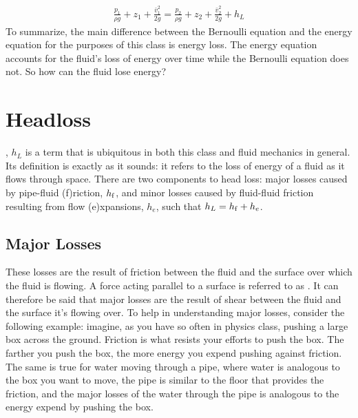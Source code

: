\documentclass[letterpaper,10pt,english]{sphinxmanual}
\begin{document}
\begin{equation}\label{equation:Fluids_Review/Fluids_Review_Design:Fluids_Review/Fluids_Review_Design:8}
\begin{split}\frac{p_{1}}{\rho g} + z_{1} + \frac{\bar v_{1}^2}{2g} = \frac{p_{2}}{\rho g} + z_{2} + \frac{\bar v_{2}^2}{2g} + h_L\end{split}
\end{equation}
 To summarize, the main difference between the Bernoulli equation and the energy equation for the purposes of this class is energy loss. The energy equation accounts for the fluid’s loss of energy over time while the Bernoulli equation does not. So how can the fluid lose energy?


\section{Headloss}
\label{\detokenize{Fluids_Review/Fluids_Review_Design:headloss}}\label{\detokenize{Fluids_Review/Fluids_Review_Design:id6}}
, \(h_L\) is a term that is ubiquitous in both this class and fluid mechanics in general. Its definition is exactly as it sounds: it refers to the loss of energy of a fluid as it flows through space. There are two components to head loss: major losses caused by pipe-fluid (f)riction, \(h_{\rm{f}}\), and minor losses caused by fluid-fluid friction resulting from flow (e)xpansions, \(h_e\), such that \(h_L = h_{\rm{f}} + h_e\).


\subsection{Major Losses}
\label{\detokenize{Fluids_Review/Fluids_Review_Design:major-losses}}\label{\detokenize{Fluids_Review/Fluids_Review_Design:id7}}
These losses are the result of friction between the fluid and the surface over which the fluid is flowing. A force acting parallel to a surface is referred to as . It can therefore be said that major losses are the result of shear between the fluid and the surface it’s flowing over. To help in understanding major losses, consider the following example: imagine, as you have so often in physics class, pushing a large box across the ground. Friction is what resists your efforts to push the box. The farther you push the box, the more energy you expend pushing against friction. The same is true for water moving through a pipe, where water is analogous to the box you want to move, the pipe is similar to the floor that provides the friction, and the major losses of the water through the pipe is analogous to the energy  expend by pushing the box.
\end{document}
